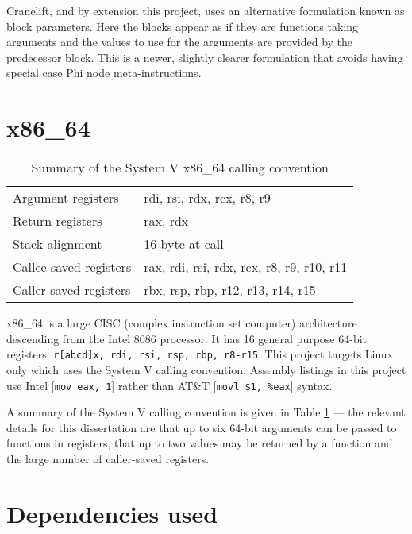 Cranelift, and by extension this project, uses an alternative formulation known as block
parameters.
Here the blocks appear as if they are functions taking arguments and the values to use for the
arguments are provided by the predecessor block. This is a newer, slightly clearer formulation that
avoids having special case Phi node meta-instructions.

\section{x86\_64}

\begin{table}[h]
    \centering

    \begin{tabular}{ll}\toprule
        Argument registers     & rdi, rsi, rdx, rcx, r8, r9                \\
        Return registers       & rax, rdx                                  \\
        Stack alignment        & 16-byte at call                           \\
        Callee-saved registers & rax, rdi, rsi, rdx, rcx, r8, r9, r10, r11 \\
        Caller-saved registers & rbx, rsp, rbp, r12, r13, r14, r15         \\
        \bottomrule
    \end{tabular}

    \caption{Summary of the System V x86\_64 calling convention}
    \label{table:systemv}

\end{table}

x86\_64 is a large CISC (complex instruction set computer) architecture descending from the Intel
8086 processor.
It has 16 general purpose 64-bit registers: \texttt{r[abcd]x, rdi, rsi, rsp, rbp, r8-r15}.
This
project targets Linux only which uses the System V
calling convention. Assembly listings in this project use Intel
    [\texttt{mov eax, 1}] rather than AT\&T [\texttt{movl
    \$1, \%eax}] syntax.

A summary of the System V calling convention is given in Table \ref{table:systemv} --- the relevant
details for this dissertation are
that up to six 64-bit arguments can be passed to functions in registers, that up to two values may
be returned by a
function
and the large number of caller-saved registers.
\section{Dependencies used}

